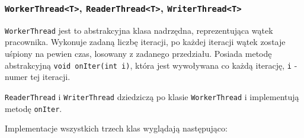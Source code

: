 \documentclass[11pt]{article}
\begin{document}
    \hypertarget{workerthreadt-readerthreadt-writerthreadt}{%
\subsubsection{\texorpdfstring{\texttt{WorkerThread\textless{}T\textgreater{}},
\texttt{ReaderThread\textless{}T\textgreater{}},
\texttt{WriterThread\textless{}T\textgreater{}}}{WorkerThread\textless T\textgreater, ReaderThread\textless T\textgreater, WriterThread\textless T\textgreater{}}}\label{workerthreadt-readerthreadt-writerthreadt}}

\texttt{WorkerThread} jest to abstrakcyjna klasa nadrzędna,
reprezentująca wątek pracownika. Wykonuje zadaną liczbę iteracji, po
każdej iteracji wątek zostaje uśpiony na pewien czas, losowany z
zadanego przedziału. Posiada metodę abstrakcyjną
\texttt{void\ onIter(int\ i)}, która jest wywoływana co każdą iterację,
\texttt{i} - numer tej iteracji.

\texttt{ReaderThread} i \texttt{WriterThread} dziedziczą po klasie
\texttt{WorkerThread} i implementują metodę \texttt{onIter}.

Implementacje wszystkich trzech klas wyglądają następująco:
\end{document}
